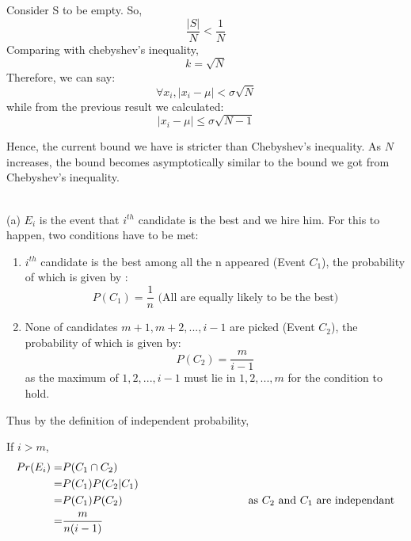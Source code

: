 \documentclass[a4paper,12pt,answers]{exam}
\begin{document}
\begin{questions}
\begin{solution}
Consider S to be empty. So,
\[
    \frac{|S|}{N} < \frac{1}{N}
\]
Comparing with chebyshev's inequality,
\[
    k = \sqrt{N}
\]
Therefore, we can say:
\[
    \forall x_i,  |x_i - \mu| < \sigma \sqrt{N}
\] 
while from the previous result we calculated:
\[
    |x_i - \mu| \leq \sigma \sqrt{N-1}
\]

Hence, the current bound we have is stricter than Chebyshev's inequality. As $N$ increases, the bound becomes asymptotically similar to the bound we got from Chebyshev's inequality.

\end{solution}


\begin{solution}\\
(a) $E_i$ is the event that $i^{th}$ candidate is the best and we hire him. For this to happen, two conditions have to be met:
\begin{enumerate}
    \item $i^{th}$ candidate is the best among all the n appeared (Event $C_{1}$), the probability of which is given by :
    \[ P(C_1)=\frac{1}{n} \text{     (All are equally likely to be the best)} \]
    
    \item  None of candidates $m+1, m+2, ..., i-1$ are picked (Event $C_{2}$), the probability of which is given by:
    \[
    P(C_{2})=\frac{m}{i-1}
    \]
    as the maximum of $1, 2, ..., i-1$ must lie in $1, 2, ..., m$ for the condition to hold.
\end{enumerate}
Thus by the definition of independent probability, 

If $i>m$,
\[
\begin{aligned}
    Pr(E_{i})=&P(C_{1} \cap C_{2})\\
   =&P(C_{1})P(C_{2}|C_{1})\\
    =&P(C_{1})P(C_{2}) \hspace{40 mm} \text{as $C_2$ and $C_1$ are independant}\\
    =&\frac{m}{n(i-1)}
\end{aligned}
\]


\end{solution}
\end{questions}
\end{document}
